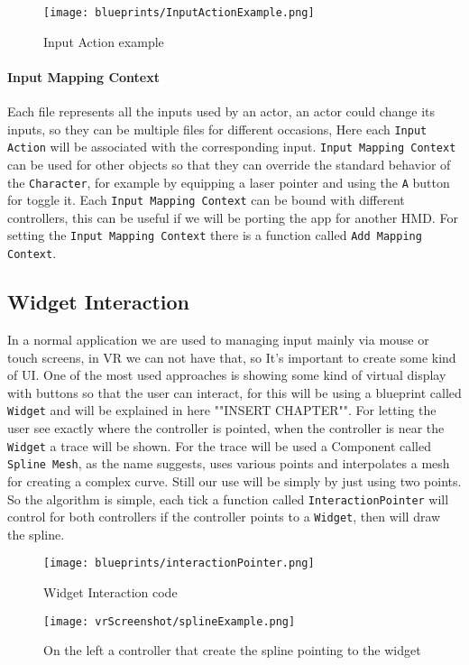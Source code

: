 \begin{figure}[h]
    \centering
    \texttt{[image: blueprints/InputActionExample.png]}
    \caption{Input Action example}
    \label{fig:InputAction}
\end{figure}

\paragraph{Input Mapping Context}
Each file represents all the inputs used by an actor, an actor could change its inputs, so they can be multiple files for different occasions,
Here each \verb|Input Action| will be associated with the corresponding input.
\verb|Input Mapping Context| can be used for other objects so that they can override the standard behavior of the \verb|Character|, for example by equipping a laser pointer and using the \verb|A| button for toggle it.
Each \verb|Input Mapping Context| can be bound with different controllers, this can be useful if we will be porting the app for another \ac{HMD}.
For setting the \verb|Input Mapping Context| there is a function called \verb|Add Mapping Context|.

\subsection{Widget Interaction}
\noindent 
In a normal application we are used to managing input mainly via mouse or touch screens, in \ac{VR} we can not have that, so It's important to create some kind of \ac{UI}.
One of the most used approaches is showing some kind of virtual display with buttons so that the user can interact, for this will be using a blueprint called \verb|Widget| and will be explained in here ""INSERT CHAPTER"".
For letting the user see exactly where the controller is pointed, when the controller is near the \verb|Widget| a trace will be shown.
For the trace will be used a Component called \verb|Spline Mesh|, as the name suggests, uses various points and interpolates a mesh for creating a complex curve.
Still our use will be simply by just using two points. So the algorithm is simple, each tick a function called \verb|InteractionPointer| will control for both controllers if the controller points to a \verb|Widget|, then will draw the spline.

\begin{figure}[h]
    \centering
    \texttt{[image: blueprints/interactionPointer.png]}
    \caption{Widget Interaction code}
    \label{fig:InteractionPointer}
\end{figure}

\begin{figure}[h]
    \centering
    \texttt{[image: vrScreenshot/splineExample.png]}
    \caption{On the left a controller that create the spline pointing to the widget}
    \label{fig:splineExample}
\end{figure}